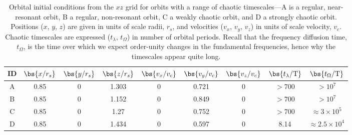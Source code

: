 \begin{table}[ht]
\begin{center}
	\begin{tabular}{c | c c c c c c | c c}
		{\bf ID} & $\bs{x/r_s}$ & $\bs{y/r_s}$ & $\bs{z/r_s}$ & $\bs{v_x/v_c}$ & $\bs{v_y/v_c}$ & $\bs{v_z/v_c}$ & $\bs{t_\lambda/\periods}$ & $\bs{t_\Omega/\periods}$ \\\toprule
A & 0.85 & 0 & 1.303 & 0 & 0.721 & 0 & $>700$ & $>10^7$ \\
\midrule
B & 0.85 & 0 & 1.152 & 0 & 0.849 & 0 & $>700$ & $>10^7$\\
\midrule
C & 0.85 & 0 & 1.27 & 0 & 0.752 & 0 & $>700$ & $\approx 3\times10^5$\\
\midrule
D & 0.85 & 0 & 1.434 & 0 & 0.597 & 0 & 8.14 & $\approx 2.5\times10^4$\\
		\bottomrule
		\end{tabular}
    \caption{Orbital initial conditions from the $xz$ grid for orbits with a
    range of chaotic timescales---A is a regular, near-resonant orbit, B a
    regular, non-resonant orbit, C a weakly chaotic orbit, and D a strongly
    chaotic orbit. Positions ($x$, $y$, $z$) are given in units of scale radii,
    $r_s$, and velocities ($v_x$, $v_y$, $v_z$) in units of scale velocity,
    $v_c$. Chaotic timescales are expressed ($t_\lambda$, $t_\Omega$) in number
    of orbital periods. Recall that the frequency diffusion time, $t_\Omega$, is
    the time over which we expect order-unity changes in the fundamental
    frequencies, hence why the timescales appear quite long.
    \label{tbl:orbit-info}}
\end{center}
\end{table}

